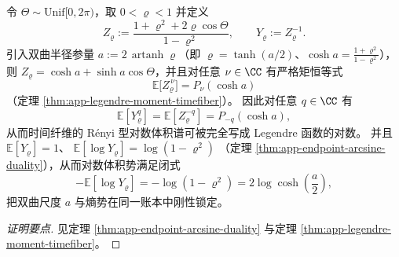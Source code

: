 \begin{conclusion}\label{con:xi-terminal-timefiber-legendre-renyi-spectrum}
令 \(\Theta\sim\mathrm{Unif}[0,2\pi)\)，取 \(0<\varrho<1\) 并定义
\[
Z_{\varrho}:=\frac{1+\varrho^2+2\varrho\cos\Theta}{1-\varrho^2},
\qquad
Y_{\varrho}:=Z_{\varrho}^{-1}.
\]
引入双曲半径参量 \(a:=2\,\operatorname{artanh}\varrho\)（即 \(\varrho=\tanh(a/2)\)、\(\cosh a=\frac{1+\varrho^{2}}{1-\varrho^{2}}\)），则 \(Z_{\varrho}=\cosh a+\sinh a\cos\Theta\)，并且对任意 \(\nu\in\CC\) 有严格矩恒等式
\[
\mathbb{E}\bigl[Z_{\varrho}^{\,\nu}\bigr]=P_{\nu}(\cosh a)
\]
（定理 \ref{thm:app-legendre-moment-timefiber}）。
因此对任意 \(q\in\CC\) 有
\[
\mathbb{E}[Y_{\varrho}^{q}]=\mathbb{E}[Z_{\varrho}^{-q}]=P_{-q}(\cosh a),
\]
从而时间纤维的 Rényi 型对数体积谱可被完全写成 Legendre 函数的对数。
并且
\(
\mathbb{E}[Y_{\varrho}]=1
\)、
\(
\mathbb{E}[\log Y_{\varrho}]=\log(1-\varrho^{2})
\)
（定理 \ref{thm:app-endpoint-arcsine-duality}），从而对数体积势满足闭式
\[
-\mathbb{E}[\log Y_{\varrho}]=-\log(1-\varrho^2)=2\log\cosh\!\left(\frac{a}{2}\right),
\]
把双曲尺度 \(a\) 与熵势在同一账本中刚性锁定。
\end{conclusion}
\begin{proof}[证明要点]
见定理 \ref{thm:app-endpoint-arcsine-duality} 与定理 \ref{thm:app-legendre-moment-timefiber}。
\end{proof}


